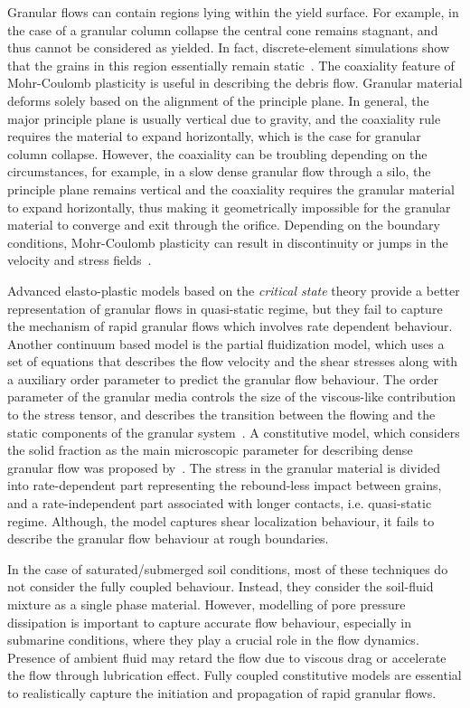 Granular flows can contain regions lying within the yield surface. For 
example, in the case of a granular column collapse the central cone remains 
stagnant, and thus cannot be considered as yielded. In fact, discrete-element 
simulations show that the grains in this region essentially remain 
static~\citep{Staron2005}. The coaxiality feature of Mohr-Coulomb plasticity 
is useful in describing the debris flow. Granular material deforms solely based 
on the alignment of the principle plane. In general, the major principle plane 
is usually vertical due to gravity, and the coaxiality rule requires the 
material to expand horizontally, which is the case for granular column 
collapse. However, the coaxiality can be troubling depending on the 
circumstances, for example, in a slow dense granular flow through a silo, the 
principle plane remains vertical and the coaxiality requires the granular 
material to expand horizontally, thus making it geometrically impossible for 
the granular material to converge and exit through the orifice. Depending on 
the boundary conditions, Mohr-Coulomb plasticity can result in discontinuity or 
jumps in the velocity and stress fields~\citep{Rycroft2006}. 

Advanced elasto-plastic models based on the \textit{critical state} theory
provide a better representation of granular flows in quasi-static regime, but 
they fail to capture the mechanism of rapid granular flows which involves rate 
dependent behaviour. Another continuum based model is the partial fluidization 
model, which uses a set of equations that describes the flow velocity and the 
shear stresses along with a auxiliary order parameter to predict the granular 
flow behaviour. The order parameter of the granular media controls the size of 
the viscous-like contribution to the stress tensor, and describes the 
transition between the flowing and the static components of the granular 
system~\citep{Aranson2001}. A constitutive model, which considers the solid 
fraction as the main microscopic parameter for describing dense granular flow 
was proposed by~\citet{Josserand2004}. The stress in the granular material is 
divided into rate-dependent part representing the rebound-less impact between 
grains, and a rate-independent part associated with longer contacts, i.e. 
quasi-static regime. Although, the model captures shear localization behaviour, 
it fails to describe the granular flow behaviour at rough boundaries.

In the case of saturated/submerged soil conditions, most of these techniques 
do not consider the fully coupled behaviour. Instead, they consider the 
soil-fluid mixture as a single phase material. However, modelling of pore 
pressure dissipation is important to capture accurate flow behaviour, 
especially in submarine conditions, where they play a crucial role in the flow 
dynamics. Presence of ambient fluid may retard the flow due to viscous drag or 
accelerate the flow through lubrication effect. Fully coupled constitutive 
models are essential to realistically capture the initiation and propagation of 
rapid granular flows.

